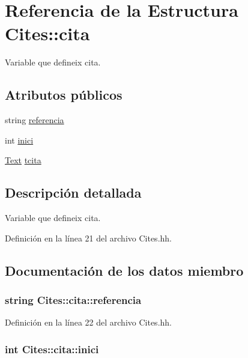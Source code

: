 \hypertarget{struct_cites_1_1cita}{}\section{Referencia de la Estructura Cites\+:\+:cita}
\label{struct_cites_1_1cita}


Variable que defineix cita.  


\subsection*{Atributos públicos}
\begin{DoxyCompactItemize}
\item 
string \hyperlink{struct_cites_1_1cita_ab67defe3a18290943868cc66afc0dc3c}{referencia}
\item 
int \hyperlink{struct_cites_1_1cita_a8dfe72277a8b07791143b5acf7c1d4f8}{inici}
\item 
\hyperlink{class_text}{Text} \hyperlink{struct_cites_1_1cita_a15992ff63124f90c1065a3c885c7d6dd}{tcita}
\end{DoxyCompactItemize}


\subsection{Descripción detallada}
Variable que defineix cita. 

Definición en la línea 21 del archivo Cites.\+hh.



\subsection{Documentación de los datos miembro}
\subsubsection[{\texorpdfstring{referencia}{referencia}}]{\setlength{\rightskip}{0pt plus 5cm}string Cites\+::cita\+::referencia}\hypertarget{struct_cites_1_1cita_ab67defe3a18290943868cc66afc0dc3c}{}\label{struct_cites_1_1cita_ab67defe3a18290943868cc66afc0dc3c}


Definición en la línea 22 del archivo Cites.\+hh.

\subsubsection[{\texorpdfstring{inici}{inici}}]{\setlength{\rightskip}{0pt plus 5cm}int Cites\+::cita\+::inici}\hypertarget{struct_cites_1_1cita_a8dfe72277a8b07791143b5acf7c1d4f8}{}\label{struct_cites_1_1cita_a8dfe72277a8b07791143b5acf7c1d4f8}


